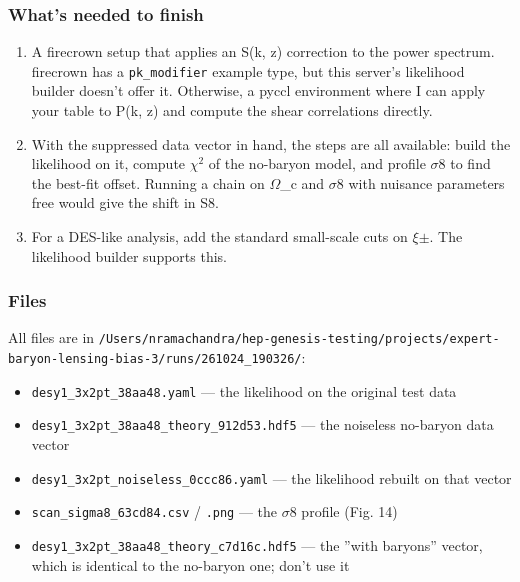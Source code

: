 \documentclass[11pt,a4paper]{article}
\begin{document}
\subsubsection*{What's needed to finish}
\begin{enumerate}
  \item A firecrown setup that applies an S(k, z) correction to the power spectrum. firecrown has a \texttt{pk\_\allowbreak{}modifier} example type, but this server's likelihood builder doesn't offer it. Otherwise, a pyccl environment where I can apply your table to P(k, z) and compute the shear correlations directly.
  \item With the suppressed data vector in hand, the steps are all available: build the likelihood on it, compute $\chi$$^2$ of the no-baryon model, and profile $\sigma$8 to find the best-fit offset. Running a chain on $\Omega$\_c and $\sigma$8 with nuisance parameters free would give the shift in S8.
  \item For a DES-like analysis, add the standard small-scale cuts on $\xi$$\pm$. The likelihood builder supports this.
\end{enumerate}
\subsubsection*{Files}
All files are in \texttt{/\allowbreak{}Users/\allowbreak{}nramachandra/\allowbreak{}hep-genesis-testing/\allowbreak{}projects/\allowbreak{}expert-baryon-lensing-bias-3/\allowbreak{}runs/\allowbreak{}261024\_\allowbreak{}190326/\allowbreak{}}:

\begin{itemize}
  \item \texttt{desy1\_\allowbreak{}3x2pt\_\allowbreak{}38aa48.yaml} --- the likelihood on the original test data
  \item \texttt{desy1\_\allowbreak{}3x2pt\_\allowbreak{}38aa48\_\allowbreak{}theory\_\allowbreak{}912d53.hdf5} --- the noiseless no-baryon data vector
  \item \texttt{desy1\_\allowbreak{}3x2pt\_\allowbreak{}noiseless\_\allowbreak{}0ccc86.yaml} --- the likelihood rebuilt on that vector
  \item \texttt{scan\_\allowbreak{}sigma8\_\allowbreak{}63cd84.csv} / \texttt{.png} --- the $\sigma$8 profile (Fig. 14)
  \item \texttt{desy1\_\allowbreak{}3x2pt\_\allowbreak{}38aa48\_\allowbreak{}theory\_\allowbreak{}c7d16c.hdf5} --- the ''with baryons'' vector, which is identical to the no-baryon one; don't use it
\end{itemize}
\end{document}
